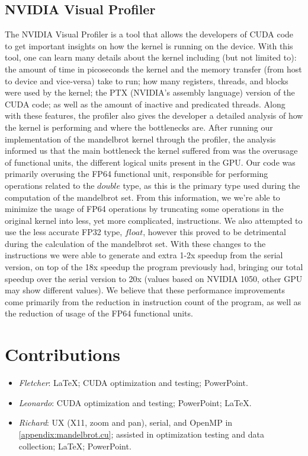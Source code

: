 \documentclass{article}
\begin{document}
    \subsection{NVIDIA Visual Profiler}
    The NVIDIA Visual Profiler is a tool that allows the developers of CUDA code to get important insights on how the kernel is running on the device. With this tool, one can learn many details about the kernel including (but not limited to): the amount of time in picoseconds the kernel and the memory transfer (from host to device and vice-versa) take to run; how many registers, threads, and blocks were used by the kernel; the PTX (NVIDIA's assembly language) version of the CUDA code; as well as the amount of inactive and predicated threads. Along with these features, the profiler also gives the developer a detailed analysis of how the kernel is performing and where the bottlenecks are. After running our implementation of the mandelbrot kernel through the profiler, the analysis informed us that the main bottleneck the kernel suffered from was the overusage of functional units, the different logical units present in the GPU. Our code was primarily overusing the FP64 functional unit, responsible for performing operations related to the $double$ type, as this is the primary type used during the computation of the mandelbrot set. From this information, we we're able to minimize the usage of FP64 operations by truncating some operations in the original kernel into less, yet more complicated, instructions. We also attempted to use the less accurate FP32 type, $float$, however this proved to be detrimental during the calculation of the mandelbrot set. With these changes to the instructions we were able to generate and extra 1-2x speedup from the serial version, on top of the 18x speedup the program previously had, bringing our total speedup over the serial version to 20x (values based on NVIDIA 1050, other GPU may show different values). We believe that these performance improvements come primarily from the reduction in instruction count of the program, as well as the reduction of usage of the FP64 functional units.

\pagebreak    
\appendix
    \section{Contributions}
        \begin{itemize}
        	\item \emph{Fletcher}: \LaTeX{}; CUDA optimization and testing; PowerPoint.

        	\item \emph{Leonardo}: CUDA optimization and testing; PowerPoint; \LaTeX{}.

        	\item \emph{Richard}: UX (X11, zoom and pan), serial, and OpenMP in \ref{appendix:mandelbrot.cu}; assisted in optimization testing and data collection; \LaTeX{}; PowerPoint.
        \end{itemize}
\end{document}
